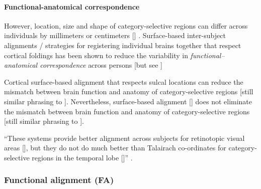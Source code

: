 


\paragraph{Functional-anatomical correspondence}

However, location, size and shape of category-selective regions can differ
across individuals by millimeters or centimeters [\citep{zhen2017quantifying,
zhen2015quantifying}] \citep{feilong2018reliable}.
%
Surface-based inter-subject alignments / strategies for registering individual
brains together that respect cortical foldings \citep{fischl1999cortical,
yeo2009spherical} has been shown to reduce the variability in
\textit{functional--anatomical correspondence} \citep{feilong2018reliable,
kumar2020brainiak} across persons \citep{klein2010evaluation,
frost2012measuring} [but see \citep{langers2014assessment}]

%
Cortical surface-based alignment \citep{fischl2012freesurfer} that respects
sulcal locations can reduce the mismatch between brain function and anatomy of
category-selective regions \citep{duncan2009consistency, frost2012measuring,
weiner2018defining, weiner2014mid} [still similar phrasing to
\citep{feilong2018reliable}].
%
Nevertheless, surface-based alignment [\citep{fischl2012freesurfer}] does not
eliminate the mismatch between brain function and anatomy of category-selective
regions \citep{duncan2009consistency, frost2012measuring, weiner2018defining,
weiner2014mid}[still similar phrasing to \citep{feilong2018reliable}].

%
``These systems provide better alignment across subjects for retinotopic visual
areas [\citep{fischl1999high}], but they do not do much better than Talairach
co-ordinates for category-selective regions in the temporal lobe
[\citep{spiridon2006location}]'' \citep{saxe2006divide}.


\subsubsection{Functional alignment (FA)}

